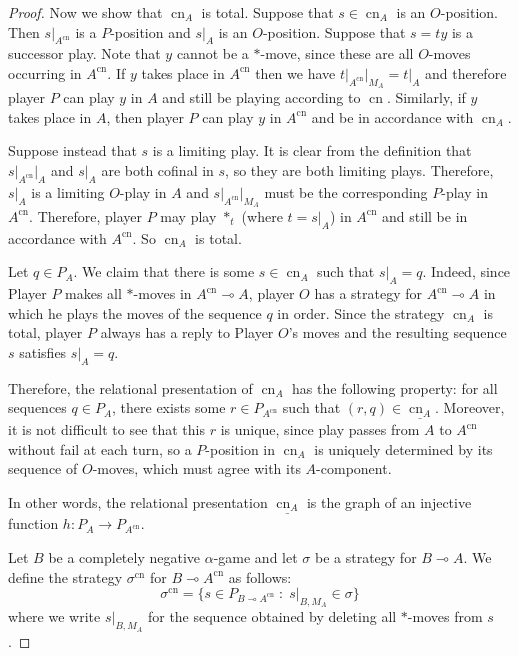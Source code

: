 \documentclass[11pt]{article} %
\theoremstyle{plain} %
\theoremstyle{definition} %
\theoremstyle{note}
\theoremstyle{exercisestyle}
\renewcommand{\implies}{\multimap}
\newcommand{\suchthat}{\;\colon\;}
\newcommand{\grel}[1]{\underline{#1}}
\DeclareMathOperator{\cn}{cn}
\begin{document}
\begin{proof}
  Now we show that $\cn_A$ is total.  Suppose that $s\in\cn_A$ is an $O$-position.  Then $s\vert_{A^{\cn}}$ is a $P$-position and $s\vert_A$ is an $O$-position.  Suppose that $s=ty$ is a successor play.  Note that $y$ cannot be a $*$-move, since these are all $O$-moves occurring in $A^{\cn}$.  If $y$ takes place in $A^{\cn}$ then we have $t\vert_{A^{\cn}}\vert_{M_A}=t\vert_A$ and therefore player $P$ can play $y$ in $A$ and still be playing according to $\cn$.  Similarly, if $y$ takes place in $A$, then player $P$ can play $y$ in $A^{\cn}$ and be in accordance with $\cn_A$.  

  Suppose instead that $s$ is a limiting play.  It is clear from the definition that $s\vert_{A^{\cn}}\vert_A$ and $s\vert_A$ are both cofinal in $s$, so they are both limiting plays.  Therefore, $s\vert_A$ is a limiting $O$-play in $A$ and $s\vert_{A^{\cn}}\vert_{M_A}$ must be the corresponding $P$-play in $A^{\cn}$.  Therefore, player $P$ may play $*_t$ (where $t=s\vert_A$) in $A^{\cn}$ and still be in accordance with $A^{\cn}$.  So $\cn_A$ is total.

  Let $q\in P_A$.  We claim that there is some $s\in\cn_A$ such that $s\vert_A=q$.  Indeed, since Player $P$ makes all $*$-moves in $A^{\cn}\implies A$, player $O$ has a strategy for $A^{\cn}\implies A$ in which he plays the moves of the sequence $q$ in order.  Since the strategy $\cn_A$ is total, player $P$ always has a reply to Player $O$'s moves and the resulting sequence $s$ satisfies $s\vert_A=q$.  

  Therefore, the relational presentation of $\cn_A$ has the following property: for all sequences $q\in P_A$, there exists some $r\in P_{A^{\cn}}$ such that $(r,q)\in\grel{\cn_A}$.  Moreover, it is not difficult to see that this $r$ is unique, since play passes from $A$ to $A^{\cn}$ without fail at each turn, so a $P$-position in $\cn_A$ is uniquely determined by its sequence of $O$-moves, which must agree with its $A$-component.  

  In other words, the relational presentation $\grel{\cn_A}$ is the graph of an injective function $h\colon P_A\to P_{A^{\cn}}$.

  Let $B$ be a completely negative $\alpha$-game and let $\sigma$ be a strategy for $B\implies A$.  We define the strategy $\sigma^{\cn}$ for $B\implies A^{\cn}$ as follows:
  \[
    \sigma^{\cn} = \{s\in P_{B\implies A^{\cn}}\suchthat s\vert_{B,M_A}\in\sigma\}
    \]
  where we write $s\vert_{B,M_A}$ for the sequence obtained by deleting all $*$-moves from $s$.  


\end{proof}
\end{document}
